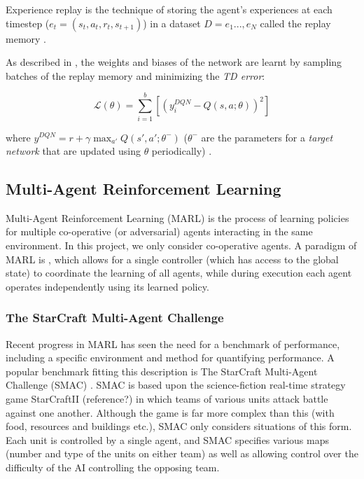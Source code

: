 Experience replay \cite{expeirnecereplay} is the technique of storing the agent's experiences at each timestep ($e_t = (s_t, a_t, r_t, s_{t+1})$) in a dataset $D = e_1..., e_N$ called the replay memory \cite{dqn}.

As described in \cite{qmix}, the weights and biases of the network are learnt by sampling batches of the replay memory and minimizing the \textit{TD error}:

\[\mathscr{L}(\theta)=\sum_{i=1}^{b}[(y_i^{DQN}-Q(s,a;\theta))^2]\]

where $y^{DQN}=r+\gamma \max_{a'}Q(s',a';\theta^-)$ ($\theta^-$ are the parameters for a \textit{target network} that are updated using $\theta$ periodically) \cite{qmix}.



\subsection{Multi-Agent Reinforcement Learning}
Multi-Agent Reinforcement Learning (MARL) is the process of learning policies for multiple co-operative (or adversarial) agents interacting in the same environment. In this project, we only consider co-operative agents. A paradigm of MARL is , which allows for a single controller (which has access to the global state) to coordinate the learning of all agents, while during execution each agent operates independently using its learned policy.

\subsubsection{The StarCraft Multi-Agent Challenge}

Recent progress in MARL has seen the need for a benchmark of performance, including a specific environment and method for quantifying performance. A popular benchmark fitting this description is The StarCraft Multi-Agent Challenge (SMAC) \cite{smac}. SMAC is based upon the science-fiction real-time strategy game StarCraftII (reference?) in which teams of various units attack battle against one another. Although the game is far more complex than this (with food, resources and buildings etc.), SMAC only considers situations of this form. Each unit is controlled by a single agent, and SMAC specifies various maps (number and type of the units on either team) as well as allowing control over the difficulty of the AI controlling the opposing team. 


